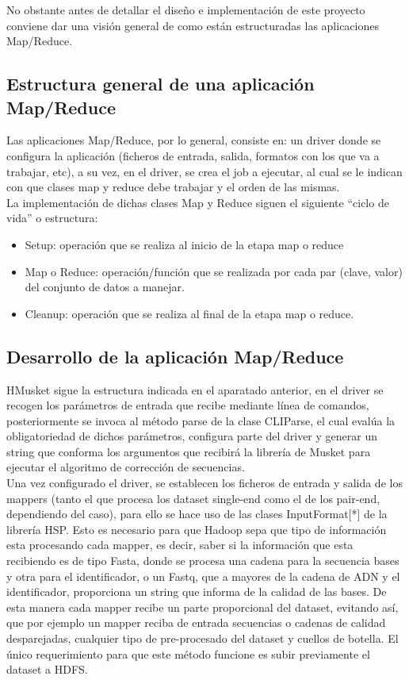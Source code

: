 \documentclass[conference]{IEEEtran}
\begin{document}
No obstante antes de detallar el diseño e implementación de este proyecto conviene dar una visión general de como están estructuradas las aplicaciones Map/Reduce.

\subsection{Estructura general de una aplicación Map/Reduce}
Las aplicaciones Map/Reduce, por lo general, consiste en: un driver donde se configura la aplicación (ficheros de entrada, salida, formatos con los que va a trabajar, etc), a su vez, en el driver, se crea el job a ejecutar, al cual se le indican con que clases map y reduce debe trabajar y el orden de las mismas.\\
La implementación de dichas clases Map y Reduce siguen el siguiente ``ciclo de vida'' o estructura:

\begin{itemize}
	\item Setup: operación que se realiza al inicio de la etapa map o reduce
	\item Map o Reduce: operación/función que se realizada por cada par (clave, valor) del conjunto de datos a manejar.
	\item Cleanup: operación que se realiza al final de la etapa map o reduce.
\end{itemize}

\subsection{Desarrollo de la aplicación Map/Reduce}
HMusket sigue la estructura indicada en el aparatado anterior, en el driver se recogen los parámetros de entrada que recibe mediante línea de comandos, posteriormente se invoca al método parse de la clase CLIParse, el cual evalúa la obligatoriedad de dichos parámetros, configura parte del driver y generar un string que conforma los argumentos que recibirá la librería de Musket para ejecutar el algoritmo de corrección de secuencias.\\
Una vez configurado el driver, se establecen los ficheros de entrada y salida de los mappers (tanto el que procesa los dataset single-end como el de los pair-end, dependiendo del caso), para ello se hace uso de las clases InputFormat[*] de la librería HSP. Esto es necesario para que Hadoop sepa que tipo de información esta procesando cada mapper, es decir, saber si la información que esta recibiendo es de tipo Fasta, donde se procesa una cadena para la secuencia bases y otra para el identificador, o un Fastq, que a mayores de la cadena de ADN y el identificador, proporciona un string que informa de la calidad de las bases. De esta manera cada mapper recibe un parte proporcional del dataset, evitando así, que por ejemplo un mapper reciba de entrada secuencias o cadenas de calidad desparejadas, cualquier tipo de pre-procesado del dataset y cuellos de botella. El único requerimiento para que este método funcione es subir previamente el dataset a HDFS.\\
\end{document}
